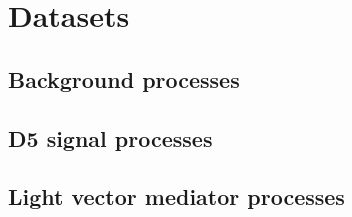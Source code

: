 \chapter{Datasets}\label{cha:datasets}
\section{Background processes}
\section{D5 signal processes}
\section{Light vector mediator processes}